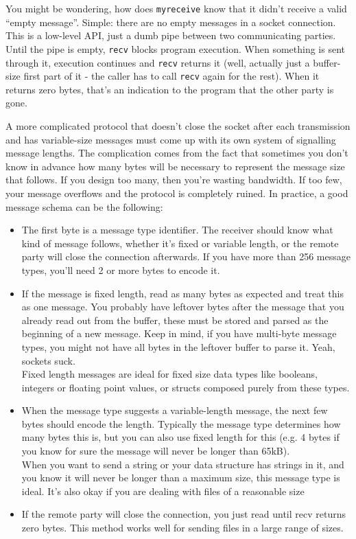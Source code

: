 You might be wondering, how does \texttt{myreceive} know that it didn’t receive a valid “empty message”. Simple: there are no empty messages in a socket connection. This is a low-level API, just a dumb pipe between two communicating parties. Until the pipe is empty, \texttt{recv} blocks program execution. When something is sent through it, execution continues and \texttt{recv} returns it (well, actually just a buffer-size first part of it - the caller has to call \texttt{recv} again for the rest). When it returns zero bytes, that’s an indication to the program that the other party is gone.

A more complicated protocol that doesn’t close the socket after each transmission and has variable-size messages must come up with its own system of signalling message lengths. The complication comes from the fact that sometimes you don’t know in advance how many bytes will be necessary to represent the message size that follows. If you design too many, then you’re wasting bandwidth. If too few, your message overflows and the protocol is completely ruined. In practice, a good message schema can be the following:

\begin{itemize}
\item The first byte is a message type identifier. The receiver should know what kind of message follows, whether it’s fixed or variable length, or the remote party will close the connection afterwards. If you have more than 256 message types, you’ll need 2 or more bytes to encode it.
\item If the message is fixed length, read as many bytes as expected and treat this as one message. You probably have leftover bytes after the message that you already read out from the buffer, these must be stored and parsed as the beginning of a new message. Keep in mind, if you have multi-byte message types, you might not have all bytes in the leftover buffer to parse it. Yeah, sockets suck. \\
Fixed length messages are ideal for fixed size data types like booleans, integers or floating point values, or structs composed purely from these types.  
\item When the message type suggests a variable-length message, the next few bytes should encode the length. Typically the message type determines how many bytes this is, but you can also use fixed length for this (e.g. 4 bytes if you know for sure the message will never be longer than 65kB). \\
  When you want to send a string or your data structure has strings in it, and you know it will never be longer than a maximum size, this message type is ideal. It’s also okay if you are dealing with files of a reasonable size
\item If the remote party will close the connection, you just read until recv returns zero bytes. This method works well for sending files in a large range of sizes.
\end{itemize}

